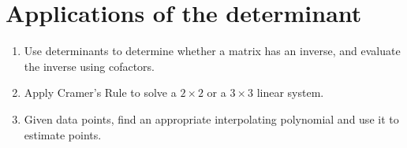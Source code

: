\section{Applications of the determinant}

\begin{outcome}
  \begin{enumerate}
  \item Use determinants to determine whether a matrix has an inverse,
    and evaluate the inverse using cofactors.
  \item Apply Cramer's Rule to solve a $2\times 2$ or a $3\times 3$
    linear system.
  \item Given data points, find an appropriate interpolating
    polynomial and use it to estimate points.
  \end{enumerate}
\end{outcome}
